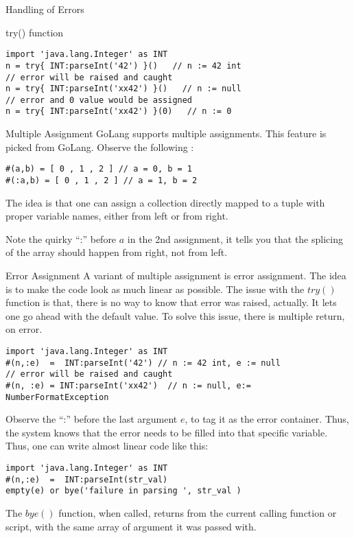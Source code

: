 \begin{section}{Handling of Errors}
\begin{subsection}{try() function}
\begin{lstlisting}[style=JexlStyle]
import 'java.lang.Integer' as INT 
n = try{ INT:parseInt('42') }()   // n := 42 int 
// error will be raised and caught 
n = try{ INT:parseInt('xx42') }()   // n := null
// error and 0 value would be assigned 
n = try{ INT:parseInt('xx42') }(0)   // n := 0
\end{lstlisting}

\end{subsection}

\begin{subsection}{Multiple Assignment}
GoLang supports multiple assignments. This feature is picked from GoLang.
Observe the following :

\begin{lstlisting}[style=JexlStyle]
#(a,b) = [ 0 , 1 , 2 ] // a = 0, b = 1 
#(:a,b) = [ 0 , 1 , 2 ] // a = 1, b = 2 
\end{lstlisting}

The idea is that one can assign a collection 
directly mapped to a tuple with proper variable names, 
either from left or from right. 

Note the quirky ``:'' before $a$
in the 2nd assignment, it tells you that the splicing of the array
should happen from right, not from left.

\end{subsection}

\begin{subsection}{Error Assignment}
A variant of multiple assignment is error assignment.
The idea is to make the code look as much linear as possible.
The issue with the $try()$ function is that, there is no way to know
that error was raised, actually. It lets one go ahead with the default value.
To solve this issue, there is multiple return, on error.

\begin{lstlisting}[style=JexlStyle]
import 'java.lang.Integer' as INT 
#(n,:e)  =  INT:parseInt('42') // n := 42 int, e := null 
// error will be raised and caught 
#(n, :e) = INT:parseInt('xx42')  // n := null, e:= NumberFormatException 
\end{lstlisting}

Observe the ``:'' before the last argument $e$, to tag it as the error container.
Thus, the system knows that the error needs to be filled into that specific variable.
Thus, one can write almost linear code like this:

\begin{lstlisting}[style=JexlStyle]
import 'java.lang.Integer' as INT 
#(n,:e)  =  INT:parseInt(str_val)
empty(e) or bye('failure in parsing ', str_val )  
\end{lstlisting}
The $bye()$ function, when called, returns from the current calling function or script,
with the same array of argument it was passed with. 

\end{subsection}
\end{section}

